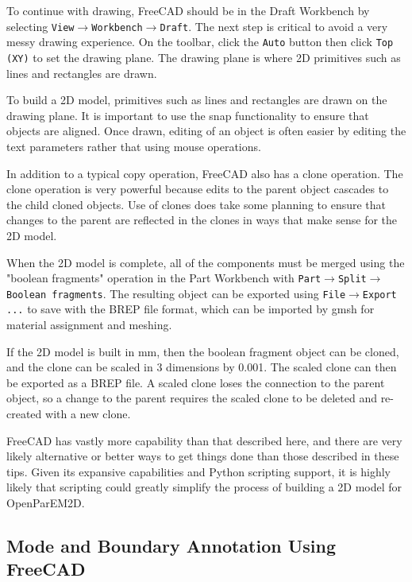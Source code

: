 \documentclass[titlepage]{article}
\renewcommand\_{\textunderscore\linebreak[1]}
\begin{document}
To continue with drawing, FreeCAD should be in the Draft Workbench by selecting \newline\texttt{View}$\rightarrow$\texttt{Workbench}$\rightarrow$\texttt{Draft}.  The next step is critical to avoid a very messy drawing experience.  On the toolbar, click the \texttt{Auto} button then click \texttt{Top (XY)} to set the drawing plane.  The drawing plane is where 2D primitives such as lines and rectangles are drawn.

To build a 2D model, primitives such as lines and rectangles are drawn on the drawing plane.  It is important to use the snap functionality to ensure that objects are aligned.  Once drawn, editing of an object is often easier by editing the text parameters rather that using mouse operations.

In addition to a typical copy operation, FreeCAD also has a clone operation.  The clone operation is very powerful because edits to the parent object cascades to the child cloned objects.  Use of clones does take some planning to ensure that changes to the parent are reflected in the clones in ways that make sense for the 2D model.

When the 2D model is complete, all of the components must be merged using the "boolean fragments" operation in the Part Workbench with \texttt{Part}$\rightarrow$\texttt{Split}$\rightarrow$\texttt{Boolean fragments}.  The resulting object can be exported using \texttt{File}$\rightarrow$\texttt{Export ...} to save with the BREP file format, which can be imported by gmsh for material assignment and meshing. 

If the 2D model is built in mm, then the boolean fragment object can be cloned, and the clone can be scaled in 3 dimensions by 0.001.  The scaled clone can then be exported as a BREP file.  A scaled clone loses the connection to the parent object, so a change to the parent requires the scaled clone to be deleted and re-created with a new clone.

FreeCAD has vastly more capability than that described here, and there are very likely alternative or better ways to get things done than those described in these tips.  Given its expansive capabilities and Python scripting support, it is highly likely that scripting could greatly simplify the process of building a 2D model for OpenParEM2D.

\subsection{Mode and Boundary Annotation Using FreeCAD}
\end{document}

